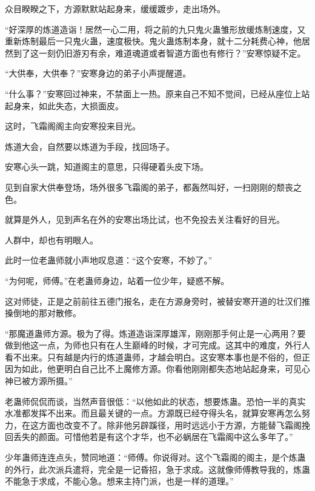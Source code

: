 
\begin{this_body}



众目睽睽之下，方源默默站起身来，缓缓踱步，走出场外。

“好深厚的炼道造诣！居然一心二用，将之前的九只鬼火蛊雏形放缓炼制速度，又重新炼制最后一只鬼火蛊，速度极快。鬼火蛊炼制本身，就十二分耗费心神，他居然到了这一刻仍旧游刃有余，难道魂道或者智道方面也有修行？”安寒惊疑不定。

“大供奉，大供奉？”安寒身边的弟子小声提醒道。

“什么事？”安寒回过神来，不禁面上一热。原来自己不知不觉间，已经从座位上站起身来，如此失态，大损面皮。

这时，飞霜阁阁主向安寒投来目光。

炼道大会，自然要以炼道为手段，找回场子。

安寒心头一跳，知道阁主的意思，只得硬着头皮下场。

见到自家大供奉登场，场外很多飞霜阁的弟子，都轰然叫好，一扫刚刚的颓丧之色。

就算是外人，见到声名在外的安寒出场比试，也不免投去关注看好的目光。

人群中，却也有明眼人。

此时一位老蛊师就小声地叹息道：“这个安寒，不妙了。”

“为何呢，师傅。”在老蛊师身边，站着一位少年，疑惑不解。

这对师徒，正是之前前往五德门报名，走在方源身旁时，被替安寒开道的壮汉们推搡倒地的那对散修。

“那魔道蛊师方源。极为了得。炼道造诣深厚雄浑，刚刚那手何止是一心两用？要做到他这一点，为师也只有在人生巅峰的时候，才可完成。这其中的难度，外行人看不出来。只有越是内行的炼道蛊师，才越会明白。这安寒本事也是不俗的，但正因为如此，他更明白自己比不上魔修方源。你看他刚刚都失态地站起身来，可见心神已被方源所摄。”

老蛊师侃侃而谈，当然声音很低：“以他如此的状态，想要炼蛊。恐怕一半的真实水准都发挥不出来。而且最关键的一点。方源既已经夺得头名，就算安寒再怎么努力，在这方面也改变不了。除非他另辟蹊径，用时远远小于方源，方能替飞霜阁挽回丢失的颜面。可惜他若是有这个才华，也不必蜗居在飞霜阁中这么多年了。”

少年蛊师连连点头，赞同地道：“师傅。你说得对。这个飞霜阁的阁主，是个炼蛊的外行，此次派兵遣将，完全是一记昏招，急于求成。这就像师傅教导我的，炼蛊不能急于求成，不能心急。想来主持门派，也是一样的道理。”


\end{this_body}
